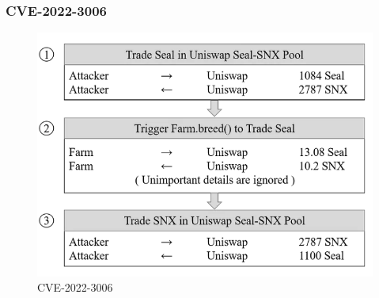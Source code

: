 \begin{frame}
    \frametitle{CVE-2022-3006}
    \begin{figure}
        \centering
        \includegraphics[scale = 0.3]{decentralisation/cve_2022_3006.png}
        \caption{CVE-2022-3006}
      \end{figure}
\end{frame}